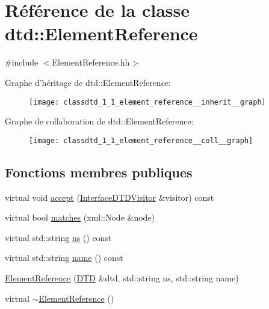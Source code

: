 \hypertarget{classdtd_1_1_element_reference}{
\section{Référence de la classe dtd::ElementReference}
\label{classdtd_1_1_element_reference}
}


{\ttfamily \#include $<$ElementReference.hh$>$}



Graphe d'héritage de dtd::ElementReference:\nopagebreak
\begin{figure}[H]
\begin{center}
\leavevmode
\texttt{[image: classdtd\_1\_1\_element\_reference\_\_inherit\_\_graph]}
\end{center}
\end{figure}


Graphe de collaboration de dtd::ElementReference:\nopagebreak
\begin{figure}[H]
\begin{center}
\leavevmode
\texttt{[image: classdtd\_1\_1\_element\_reference\_\_coll\_\_graph]}
\end{center}
\end{figure}
\subsection*{Fonctions membres publiques}
\begin{DoxyCompactItemize}
\item 
virtual void \hyperlink{classdtd_1_1_element_reference_ade77978609f7a872d73c9507057f12a6}{accept} (\hyperlink{classdtd_1_1_interface_d_t_d_visitor}{InterfaceDTDVisitor} \&visitor) const 
\item 
virtual bool \hyperlink{classdtd_1_1_element_reference_addbee5c126c3df5a509398343fe3d043}{matches} (xml::Node \&node)
\item 
virtual std::string \hyperlink{classdtd_1_1_element_reference_a24bcadd2a54f4195d84e583d8c2fc807}{ns} () const 
\item 
virtual std::string \hyperlink{classdtd_1_1_element_reference_aa478c58671bcfb2708364fb7dea35a29}{name} () const 
\item 
\hyperlink{classdtd_1_1_element_reference_a9b1697e8b813ba8214b028e2058bde8c}{ElementReference} (\hyperlink{classdtd_1_1_d_t_d}{DTD} \&dtd, std::string ns, std::string name)
\item 
virtual \hyperlink{classdtd_1_1_element_reference_ab95dafaf2cc11bafbd94ecc74f9f0c7f}{$\sim$ElementReference} ()
\end{DoxyCompactItemize}
